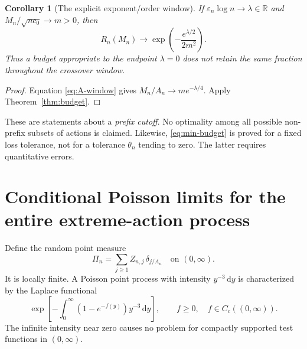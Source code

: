 \documentclass[11pt,a4paper]{article}
\numberwithin{equation}{section}
\newtheorem{corollary}[theorem]{Corollary}
\theoremstyle{definition}
\theoremstyle{remark}
\newcommand{\R}{\mathbb R}
\newcommand{\eps}{\varepsilon}
\newcommand{\dd}{\,\mathrm d}
\begin{document}
\begin{corollary}[The explicit exponent/order window]
\label{cor:window-budget}
If \(\eps_n\log n\to\lambda\in\R\) and
\(M_n/\sqrt{nc_0}\to m>0\), then
\begin{equation}
 R_n(M_n)\longrightarrow
 \exp\left(-\frac{e^{\lambda/2}}{2m^2}\right).
 \label{eq:window-budget}
\end{equation}
Thus a budget appropriate to the endpoint \(\lambda=0\) does not retain the
same fraction throughout the crossover window.
\end{corollary}
\begin{proof}
Equation \eqref{eq:A-window} gives
\(M_n/A_n\to me^{-\lambda/4}\). Apply Theorem~\ref{thm:budget}.
\end{proof}

These are statements about a \emph{prefix cutoff}. No optimality among all
possible non-prefix subsets of actions is claimed. Likewise,
\eqref{eq:min-budget} is proved for a fixed loss tolerance, not for a tolerance
\(\theta_n\) tending to zero. The latter requires quantitative errors.

\section{Conditional Poisson limits for the entire extreme-action process}
\label{sec:ppp}
Define the random point measure
\begin{equation}
 \Pi_n=\sum_{j\ge1}Z_{n,j}\,\delta_{j/A_n}
 \quad\text{on }(0,\infty).
 \label{eq:pointprocess}
\end{equation}
It is locally finite. A Poisson point process with intensity
\(y^{-3}\dd y\) is characterized by the Laplace functional
\begin{equation}
 \exp\left[-\int_0^\infty(1-e^{-f(y)})y^{-3}\dd y\right],
 \qquad f\ge0,\quad f\in C_c((0,\infty)).
 \label{eq:ppp-laplace}
\end{equation}
The infinite intensity near zero causes no problem for compactly supported
test functions in \((0,\infty)\).
\end{document}
